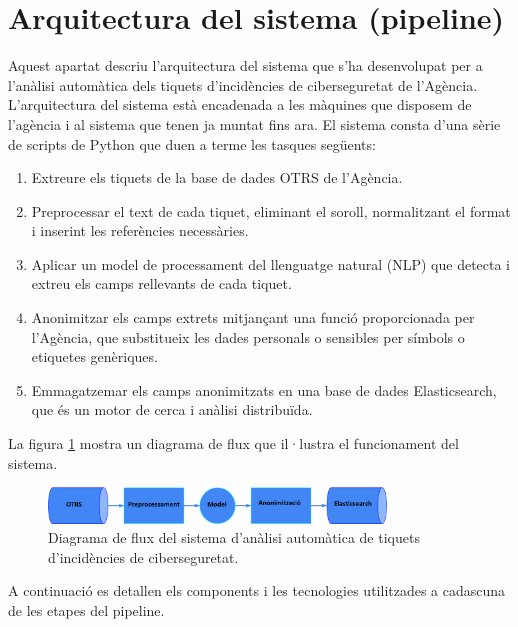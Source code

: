 \section{Arquitectura del sistema (pipeline)}
Aquest apartat descriu l'arquitectura del sistema que s'ha desenvolupat per a l'anàlisi automàtica dels tiquets d'incidències de ciberseguretat de l'Agència. L'arquitectura del sistema està encadenada a les màquines que disposem de l'agència i al sistema que tenen ja muntat fins ara. El sistema consta d'una sèrie de scripts de Python que duen a terme les tasques següents:

\begin{enumerate}
     \item Extreure els tiquets de la base de dades OTRS de l'Agència.
     \item Preprocessar el text de cada tiquet, eliminant el soroll, normalitzant el format i inserint les referències necessàries.
     \item Aplicar un model de processament del llenguatge natural (NLP) que detecta i extreu els camps rellevants de cada tiquet.
     \item Anonimitzar els camps extrets mitjançant una funció proporcionada per l'Agència, que substitueix les dades personals o sensibles per símbols o etiquetes genèriques.
     \item Emmagatzemar els camps anonimitzats en una base de dades Elasticsearch, que és un motor de cerca i anàlisi distribuïda.
\end{enumerate}

La figura \ref{fig:pipeline} mostra un diagrama de flux que il·lustra el funcionament del sistema.

\begin{figure}[H]
     \centering
     \includegraphics[width=0.8\textwidth]{pipeline.png}
     \caption{Diagrama de flux del sistema d'anàlisi automàtica de tiquets d'incidències de ciberseguretat.}
     \label{fig:pipeline}
\end{figure}

A continuació es detallen els components i les tecnologies utilitzades a cadascuna de les etapes del pipeline.
